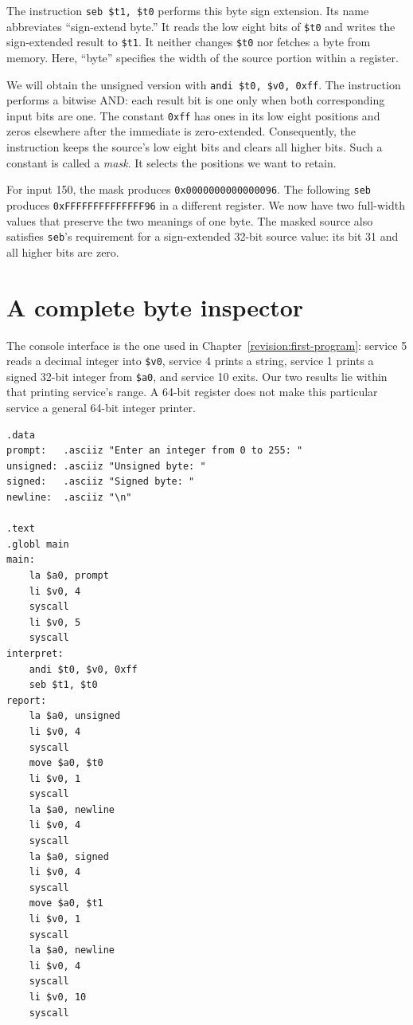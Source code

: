 The instruction \texttt{seb \$t1, \$t0} performs this byte sign extension. Its
name abbreviates ``sign-extend byte.'' It reads the low eight bits of
\texttt{\$t0} and writes the sign-extended result to \texttt{\$t1}. It neither
changes \texttt{\$t0} nor fetches a byte from memory. Here, ``byte'' specifies the
width of the source portion within a register.

We will obtain the unsigned version with \texttt{andi \$t0, \$v0, 0xff}.
The instruction performs a bitwise AND: each result bit is one only when both
corresponding input bits are one. The constant \texttt{0xff} has ones in its low
eight positions and zeros elsewhere after the immediate is zero-extended.
Consequently, the instruction keeps the source's low eight bits and clears all
higher bits. Such a constant is called a \emph{mask}. It selects the positions we
want to retain.

For input 150, the mask produces \texttt{0x0000000000000096}. The following
\texttt{seb} produces \texttt{0xFFFFFFFFFFFFFF96} in a different register.
We now have two full-width values that preserve the two meanings of one byte.
The masked source also satisfies \texttt{seb}'s requirement for a sign-extended
32-bit source value: its bit 31 and all higher bits are zero.

\section{A complete byte inspector}

The console interface is the one used in Chapter~\ref{revision:first-program}:
service 5 reads a decimal integer into \texttt{\$v0}, service 4 prints a string,
service 1 prints a signed 32-bit integer from \texttt{\$a0}, and service 10 exits.
Our two results lie within that printing service's range. A 64-bit register does
not make this particular service a general 64-bit integer printer.

\begin{verbatim}
.data
prompt:   .asciiz "Enter an integer from 0 to 255: "
unsigned: .asciiz "Unsigned byte: "
signed:   .asciiz "Signed byte: "
newline:  .asciiz "\n"

.text
.globl main
main:
    la $a0, prompt
    li $v0, 4
    syscall
    li $v0, 5
    syscall
interpret:
    andi $t0, $v0, 0xff
    seb $t1, $t0
report:
    la $a0, unsigned
    li $v0, 4
    syscall
    move $a0, $t0
    li $v0, 1
    syscall
    la $a0, newline
    li $v0, 4
    syscall
    la $a0, signed
    li $v0, 4
    syscall
    move $a0, $t1
    li $v0, 1
    syscall
    la $a0, newline
    li $v0, 4
    syscall
    li $v0, 10
    syscall
\end{verbatim}

